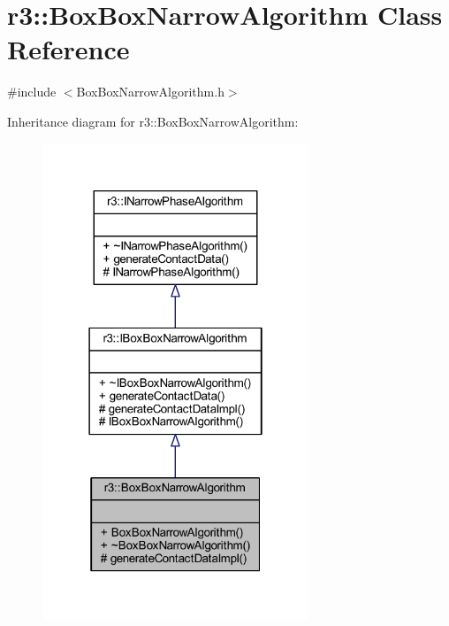 \hypertarget{classr3_1_1_box_box_narrow_algorithm}{}\section{r3\+:\+:Box\+Box\+Narrow\+Algorithm Class Reference}
\label{classr3_1_1_box_box_narrow_algorithm}


{\ttfamily \#include $<$Box\+Box\+Narrow\+Algorithm.\+h$>$}



Inheritance diagram for r3\+:\+:Box\+Box\+Narrow\+Algorithm\+:\nopagebreak
\begin{figure}[H]
\begin{center}
\leavevmode
\includegraphics[width=226pt]{classr3_1_1_box_box_narrow_algorithm__inherit__graph}
\end{center}
\end{figure}


